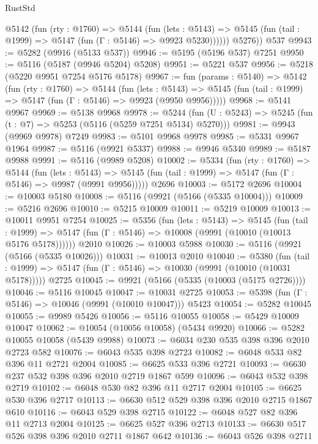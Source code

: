 \begin{lexlean}{RustStd}
\begin{coremodule}
          @5142
            (fun (rty : @1760) =>
            @5144
              (fun (lets : @5143) =>
              @5145 (fun (tail : @1999) => @5147 (fun (Γ : @5146) => @9923 @5230))))))
        @5276))
    @537
@9943 := @5282 (@9916 (@5133 @537))
@9946 := @5195 (@5196 @537) @7251
@9950 := @5116 (@5187 (@9946 @5204) @5208)
@9951 := @5221 @537
@9956 := @5218 (@5220 @9951 @7254 @5176 @5178)
@9967 := fun (params : @5140) =>
  @5142
    (fun (rty : @1760) =>
    @5144
      (fun (lets : @5143) =>
      @5145 (fun (tail : @1999) => @5147 (fun (Γ : @5146) => @9923 (@9950 @9956)))))
@9968 := @5141 @9967
@9969 := @5138 @9968
@9978 := @5244 (fun (U : @5243) => @5245 (fun (t : @7) => @5253 (@5116 (@5259 @7251 @5134) @5270)))
@9981 := @9943 (@9969 @9978) @7249
@9983 := @5101 @9968 @9978
@9985 := @5331 @9967 @1964
@9987 := @5116 (@9921 @5337)
@9988 := @9946 @5340
@9989 := @5187 @9988
@9991 := @5116 (@9989 @5208)
@10002 := @5334
    (fun (rty : @1760) =>
    @5144
      (fun (lets : @5143) =>
      @5145 (fun (tail : @1999) => @5147 (fun (Γ : @5146) => @9987 (@9991 @9956)))))
    @2696
@10003 := @5172 @2696
@10004 := @10003 @5180
@10008 := @5116 (@9921 (@5166 (@5335 @10004)))
@10009 := @5216 @2696
@10010 := @5215 @10009
@10011 := @5219 @10009
@10013 := @10011 @9951 @7254
@10025 := @5356
    (fun (lets : @5143) =>
    @5145
      (fun (tail : @1999) =>
      @5147 (fun (Γ : @5146) => @10008 (@9991 (@10010 (@10013 @5176 @5178))))))
    @2010
@10026 := @10003 @5988
@10030 := @5116 (@9921 (@5166 (@5335 @10026)))
@10031 := @10013 @2010
@10040 := @5380
    (fun (tail : @1999) => @5147 (fun (Γ : @5146) => @10030 (@9991 (@10010 (@10031 @5178)))))
    @2725
@10045 := @9921 (@5166 (@5335 (@10003 (@5175 @2726))))
@10046 := @5116 @10045
@10047 := @10031 @2725
@10053 := @5398 (fun (Γ : @5146) => @10046 (@9991 (@10010 @10047))) @5423
@10054 := @5282 @10045
@10055 := @9989 @5426
@10056 := @5116 @10055
@10058 := @5429 @10009 @10047
@10062 := @10054 (@10056 @10058) (@5434 @9920)
@10066 := @5282 @10055 @10058 (@5439 @9988)
@10073 := @6034 @230 @535 @398 @396 @2010 @2723 @582
@10076 := @6043 @535 @398 @2723
@10082 := @6048 @533 @82 @396 @11 @2721 @2004
@10085 := @6625 @533 @396 @2721
@10093 := @6630 @237 @532 @398 @396 @2010 @2719 @1867 @599
@10096 := @6043 @532 @398 @2719
@10102 := @6048 @530 @82 @396 @11 @2717 @2004
@10105 := @6625 @530 @396 @2717
@10113 := @6630 @512 @529 @398 @396 @2010 @2715 @1867 @610
@10116 := @6043 @529 @398 @2715
@10122 := @6048 @527 @82 @396 @11 @2713 @2004
@10125 := @6625 @527 @396 @2713
@10133 := @6630 @517 @526 @398 @396 @2010 @2711 @1867 @642
@10136 := @6043 @526 @398 @2711

\end{coremodule}
\end{lexlean}

